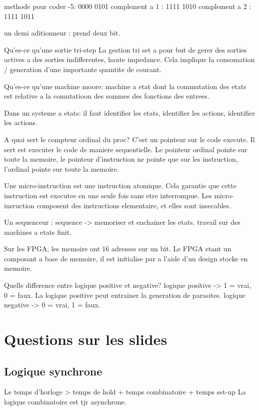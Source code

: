     methode pour coder -5:  0000 0101
    complement a 1 :	    1111 1010
    complement a 2 :	    1111 1011

    un demi aditionneur : prend deux bit.

    Qu'es-ce qu'une sortie tri-step
	La gestion tri set a pour but de gerer des sorties actives a des
	sorties indifferentes, haute impedance. Cela implique la consomation /
	generation d'une importante quantite de courant.

    Qu'es-ce qu'une machine moore:
	machine a etat dont la commutation des etats est relative a la
	comutatioon des sommes des fonctions des entrees.

	Dans un systeme a etats: il faut identifier les etats, identifier les
	actions, identifier les actions.

    A quoi sert le compteur ordinal du proc?
	C'est un pointeur sur le code execute. Il sert est executer le code de
	maniere sequentielle.
	Le pointeur ordinal pointe sur toute la memoire, le pointeur
	d'instruction ne pointe que sur les instruction, l'ordinal pointe sur
	toute la memoire.

    Une micro-instruction est une instruction atomique.
	Cela garantie que cette instruction est executee en une seule fois
	sans etre interrompue. Les micro-insruction composent des instructions
	elementaire, et elles sont insecables.

    Un sequenceur : sequence -> memoriser et enchainer les etats. travail sur
    des machines a etats finit.

    Sur les FPGA, les memoire ont 16 adresses sur un bit.
    Le FPGA etant un composant a base de memoire, il est initialise par a
    l'aide d'un design stocke en memoire.

    Quelle difference entre logique positive et negative?
    logique positive -> 1 = vrai, 0 = faux.
    La logique positive peut entrainer la generation de parasites.
    logique negative -> 0 = vrai, 1 = faux.



\section{Questions sur les slides} %
\label{sec:Questions sur les slides}
    \subsection{Logique synchrone} %
    \label{sub:Logique synchrone}
	Le temps d'horloge > temps de hold + temps combinatoire + temps set-up
	La logique combinatoire est tjr asynchrone.

